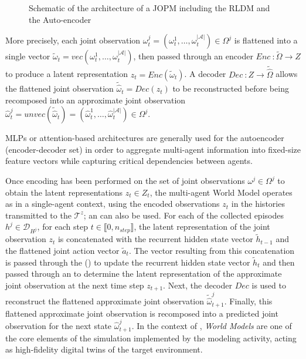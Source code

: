 \begin{figure}[h]
  \centering
  \resizebox{\textwidth}{!}{%
    
  }
  \caption{Schematic of the architecture of a JOPM including the RLDM and the Auto-encoder}
  \label{fig:jopm_architecture}
\end{figure}


More precisely, each joint observation $\omega_t^{j} = (\omega_t^1, \dots, \omega_t^{|\mathcal{A}|}) \in \Omega^{j}$ is flattened into a single vector $\tilde{\omega}_t = vec (\omega_t^1, \dots, \omega_t^{|\mathcal{A}|})$, then passed through an encoder $Enc~: \tilde{\Omega}\rightarrow Z$ to produce a latent representation $z_t = Enc(\tilde{\omega}_t)$. A decoder $Dec~: Z \rightarrow \widetilde{\hat{\Omega}}$ allows the flattened joint observation $\widetilde{\hat{\omega}}_t = Dec(z_t)$ to be reconstructed before being recomposed into an approximate joint observation $\hat{\omega}_t^{j} = unvec(\widetilde{\hat{\omega}}_t) = (\hat{\omega}_t^1, \dots, \hat{\omega}_t^{|\mathcal{A}|}) \in \Omega^ {j}$.

MLPs or attention-based architectures are generally used for the autoencoder (encoder-decoder set) in order to aggregate multi-agent information into fixed-size feature vectors while capturing critical dependencies between agents.

Once encoding has been performed on the set of joint observations $\omega^j \in \Omega^{j}$ to obtain the latent representations $z_t \in Z_t$, the multi-agent World Model operates as in a single-agent context, using the encoded observations $z_t$ in the histories transmitted to the  $\mathcal{T}^{z}$; an  can also be used. For each of the collected episodes $h^j \in \mathcal{D}_{H^j} $, for each step $t \in \llbracket 0, n_{step} \rrbracket$, the latent representation of the joint observation $z_t$ is concatenated with the recurrent hidden state vector $\tilde{h}_{t-1}$ and the flattened joint action vector $\tilde{a}_t$. The vector resulting from this concatenation is passed through the  () to update the recurrent hidden state vector $\tilde{h}_{t}$ and then passed through an  to determine the latent representation of the approximate joint observation at the next time step $z_{t+1} $. Next, the decoder $Dec$ is used to reconstruct the flattened approximate joint observation $\tilde{\hat{\omega}}_{t+1}^{j}$. Finally, this flattened approximate joint observation is recomposed into a predicted joint observation for the next state $\hat{\omega}_ {t+1}^{j}$. In the context of , \textit{World Models} are one of the core elements of the simulation implemented by the modeling activity, acting as high-fidelity digital twins of the target environment.


